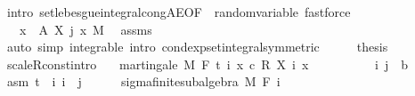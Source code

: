 \begin{isabellebody}
\ {\isacharparenleft}{\kern0pt}intro\ set{\isacharunderscore}{\kern0pt}lebesgue{\isacharunderscore}{\kern0pt}integral{\isacharunderscore}{\kern0pt}cong{\isacharunderscore}{\kern0pt}AE{\isacharbrackleft}{\kern0pt}OF\ {\isacharunderscore}{\kern0pt}\ random{\isacharunderscore}{\kern0pt}variable{\isacharbrackright}{\kern0pt}{\isacharparenright}{\kern0pt}\ fastforce{\isacharplus}{\kern0pt}\isanewline
\ \ \isamarkupfalse%
\ \isamarkupfalse%
\ {\isachardoublequoteopen}{\isachardot}{\kern0pt}{\isachardot}{\kern0pt}{\isachardot}{\kern0pt}\ {\isacharequal}{\kern0pt}\ {\isasymintegral}x\ {\isasymin}\ A{\isachardot}{\kern0pt}\ X\ j\ x\ {\isasympartial}M{\isachardoublequoteclose}\ \isamarkupfalse%
\ assms\ \isamarkupfalse%
\ {\isacharparenleft}{\kern0pt}auto\ simp{\isacharcolon}{\kern0pt}\ integrable\ intro{\isacharcolon}{\kern0pt}\ cond{\isacharunderscore}{\kern0pt}exp{\isacharunderscore}{\kern0pt}set{\isacharunderscore}{\kern0pt}integral{\isacharbrackleft}{\kern0pt}symmetric{\isacharbrackright}{\kern0pt}{\isacharparenright}{\kern0pt}\isanewline
\ \ \isamarkupfalse%
\ \isamarkupfalse%
\ {\isacharquery}{\kern0pt}thesis\ \isacommand{{\isachardot}{\kern0pt}}\isamarkupfalse%
\isanewline
{}\isamarkupfalse%
%
\endisatagproof
{\isafoldproof}%
%
\isadelimproof
\isanewline
%
\endisadelimproof
\isanewline
{}\isamarkupfalse%
\ scaleR{\isacharunderscore}{\kern0pt}const{\isacharbrackleft}{\kern0pt}intro{\isacharbrackright}{\kern0pt}{\isacharcolon}{\kern0pt}\isanewline
\ \ \ {\isachardoublequoteopen}martingale\ M\ F\ t\ {\isacharparenleft}{\kern0pt}{\isasymlambda}i\ x{\isachardot}{\kern0pt}\ c\ {\isacharasterisk}{\kern0pt}\isactrlsub R\ X\ i\ x{\isacharparenright}{\kern0pt}{\isachardoublequoteclose}\isanewline
%
\isadelimproof
%
\endisadelimproof
%
\isatagproof
{}\isamarkupfalse%
\ {\isacharminus}{\kern0pt}\isanewline
\ \ \isacommand{{\isacharbraceleft}{\kern0pt}}\isamarkupfalse%
\isanewline
\ \ \ \ \isamarkupfalse%
\ i\ j\ {\isacharcolon}{\kern0pt}{\isacharcolon}{\kern0pt}\ {\isacharprime}{\kern0pt}b\ \isamarkupfalse%
\ asm{\isacharcolon}{\kern0pt}\ {\isachardoublequoteopen}t\ {\isasymle}\ i{\isachardoublequoteclose}\ {\isachardoublequoteopen}i\ {\isasymle}\ j{\isachardoublequoteclose}\isanewline
\ \ \ \ \isamarkupfalse%
\ sigma{\isacharunderscore}{\kern0pt}finite{\isacharunderscore}{\kern0pt}subalgebra\ M\ {\isachardoublequoteopen}F\ i{\isachardoublequoteclose}\ \isamarkupfalse%

\end{isabellebody}
